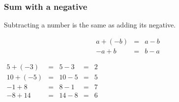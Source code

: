 \begin{frame}
\frametitle{Sum with a negative}
\begin{mathematicalRule}
Subtracting a number is the same as adding its negative.

\[
\begin{array}{rcl}
a+ (-b) &=& a-b\\
-a +b &=& b-a
\end{array}
\]
\end{mathematicalRule}
\begin{example}
\hfil\hfil $\begin{array}{rclcl} 
5+(-3)&=& 5-3 &=& 2\\
10+(-5)&=&10-5 &=& 5\\
-1 +8 &=&8-1&=&7\\
-8+14&=&14-8&=&6
\end{array}$
\end{example}
\end{frame}